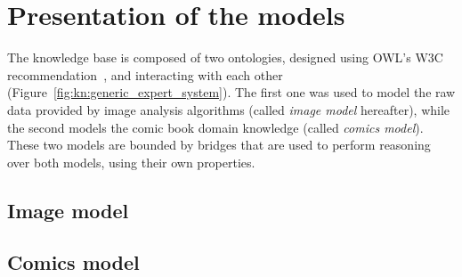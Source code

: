

\section{Presentation of the models} %
\label{sec:kn:model}

The knowledge base is composed of two ontologies, designed using OWL's W3C recommendation~\cite{McGuinness2004}, and interacting with each other (Figure~\ref{fig:kn:generic_expert_system}).
The first one was used to model the raw data provided by image analysis algorithms (called \textit{image model} hereafter), while the second models the comic book domain knowledge (called \textit{comics model}).
These two models are bounded by bridges that are used to perform reasoning over both models, using their own properties.

\subsection{Image model}


\subsection{Comics model}



	


